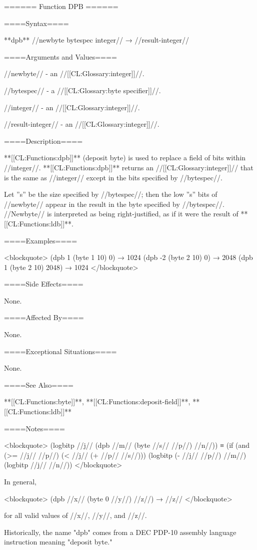 ====== Function DPB ======

====Syntax====

**dpb** //newbyte bytespec integer// → //result-integer//

====Arguments and Values====

//newbyte// - an //[[CL:Glossary:integer]]//.

//bytespec// - a //[[CL:Glossary:byte specifier]]//.

//integer// - an //[[CL:Glossary:integer]]//.

//result-integer// - an //[[CL:Glossary:integer]]//.

====Description====

**[[CL:Functions:dpb]]** (deposit byte) is used to replace a field of bits within //integer//. **[[CL:Functions:dpb]]** returns an //[[CL:Glossary:integer]]// that is the same as //integer// except in the bits specified by //bytespec//.

Let ''s'' be the size specified by //bytespec//; then the low ''s'' bits of //newbyte// appear in the result in the byte specified by //bytespec//. //Newbyte// is interpreted as being right-justified, as if it were the result of **[[CL:Functions:ldb]]**.

====Examples====

<blockquote> (dpb 1 (byte 1 10) 0) → 1024 (dpb -2 (byte 2 10) 0) → 2048 (dpb 1 (byte 2 10) 2048) → 1024 </blockquote>

====Side Effects====

None.

====Affected By====

None.

====Exceptional Situations====

None.

====See Also====

**[[CL:Functions:byte]]**, **[[CL:Functions:deposit-field]]**, **[[CL:Functions:ldb]]**

====Notes====

<blockquote> (logbitp //j// (dpb //m// (byte //s// //p//) //n//)) ≡ (if (and (>= //j// //p//) (< //j// (+ //p// //s//))) (logbitp (- //j// //p//) //m//) (logbitp //j// //n//)) </blockquote>

In general,

<blockquote> (dpb //x// (byte 0 //y//) //z//) → //z// </blockquote>

for all valid values of //x//, //y//, and //z//.

Historically, the name "dpb" comes from a DEC PDP-10 assembly language instruction meaning "deposit byte."

